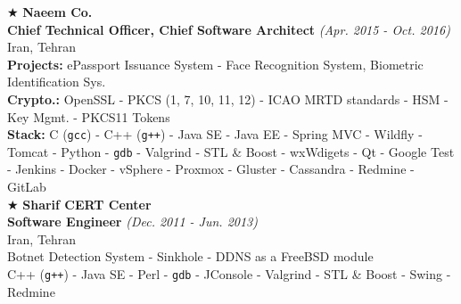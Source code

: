 \documentclass[10pt,a4paper]{article}
\begin{document}
\noindent $\bigstar$ \hspace{0.1cm} \large \textbf{Naeem Co.} \\
\indent \small \textbf{Chief Technical Officer, Chief Software Architect} \textsl{(Apr. 2015 - Oct. 2016)} \\
\indent \textnormal{Iran, Tehran} \\
\indent \textbullet \hspace{0.05cm} \textbf{Projects:} ePassport Issuance System - Face Recognition System, Biometric Identification Sys. \\
\indent \textbullet \hspace{0.05cm} \textbf{Crypto.:} OpenSSL - PKCS (1, 7, 10, 11, 12) - ICAO MRTD standards - HSM - Key Mgmt. - PKCS11 Tokens\\
\indent \textbullet \hspace{0.05cm} \textbf{Stack:} C (\texttt{gcc}) - C++ (\texttt{g++}) - Java SE - Java EE - Spring MVC - Wildfly - Tomcat - Python - \texttt{gdb} - Valgrind - STL \& Boost - wxWdigets - Qt - Google Test - Jenkins - Docker - vSphere - Proxmox - Gluster - Cassandra - Redmine - GitLab \\

\noindent $\bigstar$ \hspace{0.1cm} \large \textbf{Sharif CERT Center} \\ 
\indent \small \textbf{Software Engineer} \textsl{(Dec. 2011 - Jun. 2013)} \\
\indent \textnormal{Iran, Tehran} \\ 
\indent \textbullet \hspace{0.05cm} Botnet Detection System - Sinkhole - DDNS as a FreeBSD module \\
\indent \textbullet \hspace{0.05cm} C++ (\texttt{g++}) - Java SE - Perl - \texttt{gdb} - JConsole - Valgrind - STL \& Boost - Swing - Redmine \\
\end{document}
